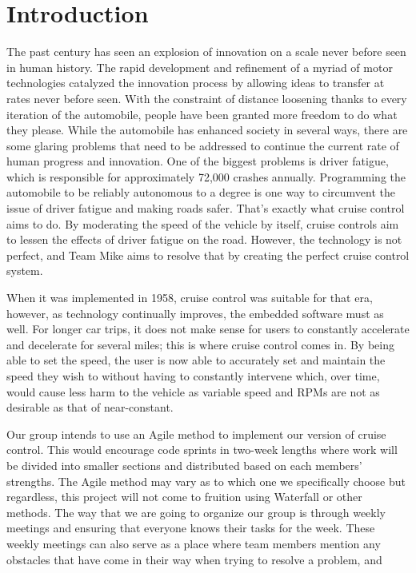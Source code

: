 \documentclass[preprint,11pt,3p]{article}
\begin{document}
\section {Introduction}
The past century has seen an explosion of innovation on a scale never before seen
in human history. The rapid development and refinement of a myriad of motor
technologies catalyzed the innovation process by allowing ideas to transfer at
rates never before seen. With the constraint of distance loosening thanks to
every iteration of the automobile, people have been granted more freedom to
do what they please. While the automobile has enhanced society in several
ways, there are some glaring problems that need to be addressed to continue
the current rate of human progress and innovation. One of the biggest problems
is driver fatigue, which is responsible for approximately 72,000 crashes annually.
Programming the automobile to be reliably autonomous to a degree is one way
to circumvent the issue of driver fatigue and making roads safer. That’s exactly
what cruise control aims to do. By moderating the speed of the vehicle by itself,
cruise controls aim to lessen the effects of driver fatigue on the road. However,
the technology is not perfect, and Team Mike aims to resolve that by creating
the perfect cruise control system. \par
When it was implemented in 1958, cruise control was suitable for that era,
however, as technology continually improves, the embedded software must as
well. For longer car trips, it does not make sense for users to constantly accelerate
and decelerate for several miles; this is where cruise control comes in. By being
able to set the speed, the user is now able to accurately set and maintain the
speed they wish to without having to constantly intervene which, over time,
would cause less harm to the vehicle as variable speed and RPMs are not as
desirable as that of near-constant. \par
Our group intends to use an Agile method to implement our version of cruise
control. This would encourage code sprints in two-week lengths where work
will be divided into smaller sections and distributed based on each members’
strengths. The Agile method may vary as to which one we specifically choose
but regardless, this project will not come to fruition using Waterfall or other
methods. The way that we are going to organize our group is through weekly
meetings and ensuring that everyone knows their tasks for the week. These
weekly meetings can also serve as a place where team members mention any
obstacles that have come in their way when trying to resolve a problem, and
\end{document}
